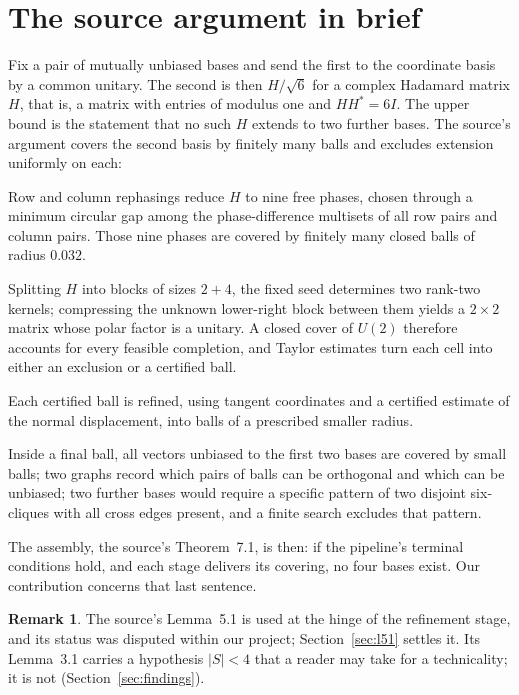 \documentclass[11pt]{article}
\theoremstyle{definition}
\newtheorem{remark}[theorem]{Remark}
\newcommand{\abs}[1]{\lvert #1\rvert}
\begin{document}
\section{The source argument in brief}
\label{sec:source}

Fix a pair of mutually unbiased bases and send the first to the coordinate basis by a common
unitary. The second is then $H/\sqrt 6$ for a complex Hadamard matrix $H$, that is, a matrix with
entries of modulus one and $HH^*=6I$. The upper bound is the statement that no such $H$ extends to
two further bases. The source's argument covers the second basis by finitely many balls and excludes
extension uniformly on each:

\begin{description}[leftmargin=1.2em,style=nextline]
\item[Seed cover.] Row and column rephasings reduce $H$ to nine free phases, chosen through a
  minimum circular gap among the phase-difference multisets of all row pairs and column pairs. Those
  nine phases are covered by finitely many closed balls of radius $0.032$.
\item[Completion.] Splitting $H$ into blocks of sizes $2+4$, the fixed seed determines two rank-two
  kernels; compressing the unknown lower-right block between them yields a $2\times2$ matrix whose
  polar factor is a unitary. A closed cover of $U(2)$ therefore accounts for every feasible
  completion, and Taylor estimates turn each cell into either an exclusion or a certified ball.
\item[Refinement.] Each certified ball is refined, using tangent coordinates and a certified
  estimate of the normal displacement, into balls of a prescribed smaller radius.
\item[Exclusion.] Inside a final ball, all vectors unbiased to the first two bases are covered by
  small balls; two graphs record which pairs of balls can be orthogonal and which can be unbiased;
  two further bases would require a specific pattern of two disjoint six-cliques with all cross
  edges present, and a finite search excludes that pattern.
\end{description}

The assembly, the source's Theorem~7.1, is then: if the pipeline's terminal conditions hold, and
each stage delivers its covering, no four bases exist. Our contribution concerns that last sentence.

\begin{remark}
The source's Lemma~5.1 is used at the hinge of the refinement stage, and its status was disputed
within our project; Section~\ref{sec:l51} settles it. Its Lemma~3.1 carries a hypothesis
$\abs S<4$ that a reader may take for a technicality; it is not (Section~\ref{sec:findings}).
\end{remark}
\end{document}
